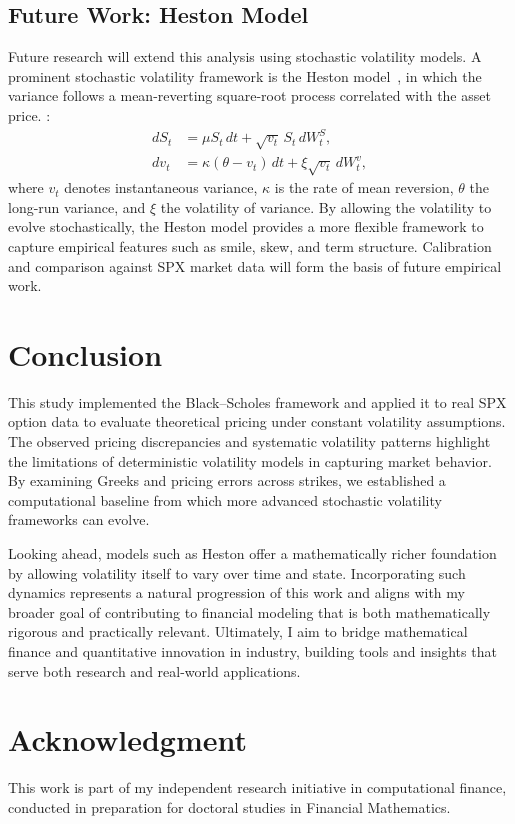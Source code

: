\documentclass[12pt]{article}
\begin{document}

\subsection{Future Work: Heston Model}
Future research will extend this analysis using stochastic volatility models. A prominent stochastic volatility framework is the Heston model~\cite{heston1993closed}, in which the variance follows a mean-reverting square-root process correlated with the asset price.
:
\begin{equation}
\begin{aligned}
dS_t &= \mu S_t\,dt + \sqrt{v_t}\, S_t\, dW_t^S, \\
dv_t &= \kappa(\theta - v_t)\,dt + \xi \sqrt{v_t}\, dW_t^v,
\end{aligned}
\end{equation}
where $v_t$ denotes instantaneous variance, $\kappa$ is the rate of mean reversion, $\theta$ the long-run variance, and $\xi$ the volatility of variance. By allowing the volatility to evolve stochastically, the Heston model provides a more flexible framework to capture empirical features such as smile, skew, and term structure. Calibration and comparison against SPX market data will form the basis of future empirical work.





\section{Conclusion}
This study implemented the Black--Scholes framework and applied it to real SPX option data to evaluate theoretical pricing under constant volatility assumptions. The observed pricing discrepancies and systematic volatility patterns highlight the limitations of deterministic volatility models in capturing market behavior. By examining Greeks and pricing errors across strikes, we established a computational baseline from which more advanced stochastic volatility frameworks can evolve.

Looking ahead, models such as Heston offer a mathematically richer foundation by allowing volatility itself to vary over time and state. Incorporating such dynamics represents a natural progression of this work and aligns with my broader goal of contributing to financial modeling that is both mathematically rigorous and practically relevant. Ultimately, I aim to bridge mathematical finance and quantitative innovation in industry, building tools and insights that serve both research and real-world applications.

\section*{Acknowledgment}
This work is part of my independent research initiative in computational finance, conducted in preparation for doctoral studies in Financial Mathematics.





\end{document}
